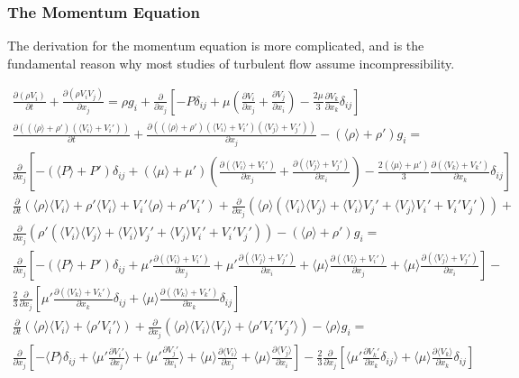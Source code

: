 \documentclass[10pt]{article}
\newcommand{\beqa}{\begin{equation}\begin{aligned}}
\newcommand{\eeqa}{\end{aligned}\end{equation}}
\newcommand{\la}{\langle}
\newcommand{\ra}{\rangle}
\begin{document}
\begin{flushleft}
\subsubsection{The Momentum Equation}
The derivation for the momentum equation is more complicated, and is the fundamental reason why most studies of turbulent flow assume incompressibility.

\beqa
\frac{\partial(\rho V_i)}{\partial t}+\frac{\partial(\rho V_iV_j)}{\partial x_j}= \rho g_i+\frac{\partial}{\partial x_j}\left\lbrack-P\delta_{ij}+\mu\left(\frac{\partial V_i}{\partial x_j}+\frac{\partial V_j}{\partial x_i}\right)-\frac{2\mu}{3}\frac{\partial V_k}{\partial x_k}\delta_{ij}\right\rbrack\\
\frac{\partial((\la\rho\ra+\rho') (\la V_i\ra+V_i'))}{\partial t}+\frac{\partial((\la\rho\ra+\rho') (\la V_i\ra+V_i')(\la V_j\ra+V_j'))}{\partial x_j}-(\la\rho\ra+\rho') g_i= \quad\quad\\
\frac{\partial}{\partial x_j}\left\lbrack-(\la P\ra+P')\delta_{ij}+(\la\mu\ra+\mu')\left(\frac{\partial (\la V_i\ra+V_i')}{\partial x_j}+\frac{\partial (\la V_j\ra+V_j')}{\partial x_i}\right)-\frac{2(\la\mu\ra+\mu')}{3}\frac{\partial (\la V_k\ra+V_k')}{\partial x_k}\delta_{ij}\right\rbrack\\
\frac{\partial}{\partial t}\left(\la \rho\ra\la V_i\ra+\rho'\la V_i\ra+V_i'\la\rho\ra+\rho' V_i'\right)+\frac{\partial}{\partial x_j}\left(\la\rho\ra(\la V_i\ra\la V_j\ra+\la V_i\ra V_j'+\la V_j\ra V_i'+V_i'V_j')\right)+\\
\frac{\partial}{\partial x_j}\left(\rho'(\la V_i\ra\la V_j\ra+\la V_i\ra V_j'+\la V_j\ra V_i'+V_i'V_j')\right)-(\la\rho\ra +\rho')g_i= \quad\quad\\
\frac{\partial}{\partial x_j}\left\lbrack-(\la P\ra+P')\delta_{ij}+\mu'\frac{\partial (\la V_i\ra+V_i')}{\partial x_j}+\mu'\frac{\partial (\la V_j\ra+V_j')}{\partial x_i}+\la\mu\ra\frac{\partial (\la V_i\ra+V_i')}{\partial x_j}+\la\mu\ra\frac{\partial (\la V_j\ra+V_j')}{\partial x_i}\right\rbrack-\\
\frac{2}{3}\frac{\partial}{\partial x_j}\left\lbrack\mu'\frac{\partial (\la V_k\ra+V_k')}{\partial x_k}\delta_{ij}+\la\mu\ra\frac{\partial (\la V_k\ra+V_k')}{\partial x_k}\delta_{ij}\right\rbrack\\
\frac{\partial}{\partial t}\left(\la \rho\ra\la V_i\ra+\la\rho' V_i'\ra\right)+\frac{\partial}{\partial x_j}\left(\la\rho\ra\la V_i\ra\la V_j\ra+\la\rho'V_i'V_j'\ra\right)-\la\rho\ra g_i= \quad\quad\\
\frac{\partial}{\partial x_j}\left\lbrack-\la P\ra\delta_{ij}+\la\mu'\frac{\partial V_i'}{\partial x_j}\ra+\la\mu'\frac{\partial V_j'}{\partial x_i}\ra+\la\mu\ra\frac{\partial \la V_i\ra}{\partial x_j}+\la\mu\ra\frac{\partial \la V_j\ra}{\partial x_i}\right\rbrack-\frac{2}{3}\frac{\partial}{\partial x_j}\left\lbrack\la\mu'\frac{\partial V_k'}{\partial x_k}\delta_{ij}\ra+\la\mu\ra\frac{\partial \la V_k\ra}{\partial x_k}\delta_{ij}\right\rbrack
\eeqa


\end{flushleft}
\end{document}
